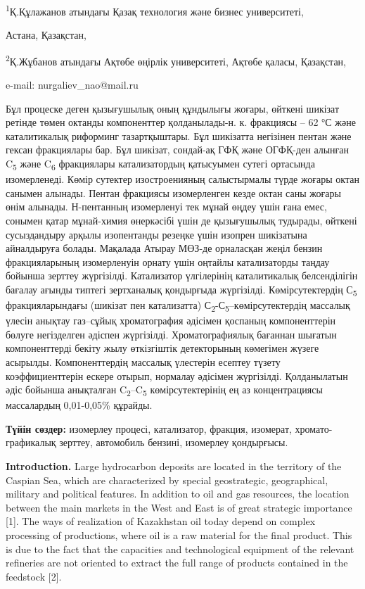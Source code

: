 \textsuperscript{1}Қ.Құлажанов атындағы Қазақ технология және бизнес
университеті,

Астана, Қазақстан,

\textsuperscript{2}Қ.Жұбанов атындағы Ақтөбе өңірлік университеті,
Ақтөбе қаласы, Қазақстан,

e-mail: nurgaliev\_nao@mail.ru

Бұл процеске деген қызығушылық оның құндылығы жоғары, өйткені шикізат
ретінде төмен октанды компоненттер қолданылады-н. к. фракциясы -- 62 °С
және каталитикалық риформинг тазартқыштары. Бұл шикізатта негізінен
пентан және гексан фракциялары бар. Бұл шикізат, сондай-ақ ГФҚ және
ОГФҚ-ден алынған C\textsubscript{5} және C\textsubscript{6} фракциялары
катализатордың қатысуымен сутегі ортасында изомерленеді. Көмір сутектер
изостроенияның салыстырмалы түрде жоғары октан санымен алынады. Пентан
фракциясы изомерленген кезде октан саны жоғары өнім алынады. Н-пентанның
изомерленуі тек мұнай өңдеу үшін ғана емес, сонымен қатар мұнай-химия
өнеркәсібі үшін де қызығушылық тудырады, өйткені сусыздандыру арқылы
изопентанды резеңке үшін изопрен шикізатына айналдыруға болады. Мақалада
Атырау МӨЗ-де орналасқан жеңіл бензин фракцияларының изомерленуін орнату
үшін оңтайлы катализаторды таңдау бойынша зерттеу жүргізілді.
Катализатор үлгілерінің каталитикалық белсенділігін бағалау ағынды
типтегі зертханалық қондырғыда жүргізілді. Көмірсутектердің
С\textsubscript{5} фракцияларындағы (шикізат пен катализатта)
С\textsubscript{2}-С\textsubscript{5}--көмірсутектердің массалық үлесін
анықтау газ--сұйық хроматография әдісімен қоспаның компоненттерін бөлуге
негізделген әдіспен жүргізілді. Хроматографиялық бағаннан шығатын
компоненттерді бекіту жылу өткізгіштік детекторының көмегімен жүзеге
асырылды. Компоненттердің массалық үлестерін есептеу түзету
коэффициенттерін ескере отырып, нормалау әдісімен жүргізілді.
Қолданылатын әдіс бойынша анықталған
C\textsubscript{2}--C\textsubscript{5} көмірсутектерінің ең аз
концентрациясы массалардың 0,01-0,05\% құрайды.

\textbf{Түйін сөздер:} изомерлеу процесі, катализатор, фракция,
изомерат, хромато-графикалық зерттеу, автомобиль бензині, изомерлеу
қондырғысы.

\textbf{Introduction.} Large hydrocarbon deposits are located in the
territory of the Caspian Sea, which are characterized by special
geostrategic, geographical, military and political features. In addition
to oil and gas resources, the location between the main markets in the
West and East is of great strategic importance {[}1{]}. The ways of
realization of Kazakhstan oil today depend on complex processing of
productions, where oil is a raw material for the final product. This is
due to the fact that the capacities and technological equipment of the
relevant refineries are not oriented to extract the full range of
products contained in the feedstock {[}2{]}.

